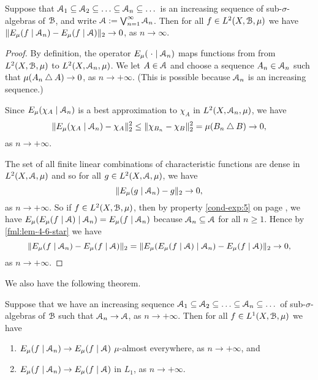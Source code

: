 \begin{lemma} \label{lem:walters-4-6}
	Suppose that $\A_1 \subset \A_2 \subset \dots \subset \A_n \subset \dots$ is an increasing sequence of sub-$\sigma$-algebras of $\mathcal{B}$, and write $\mathcal{A} := \bigvee_{n = 1}^\infty{\mathcal{A}_n}$. Then for all $f \in L^2(X, \mathcal{B}, \mu)$ we have $\|E_\mu(f \mid \mathcal{A}_n) - E_\mu(f \mid \mathcal{A})\|_2 \to 0$, as $n \to \infty$.
	\begin{proof}
		By definition, the operator $E_\mu(\mathrel{}\cdot\mathrel{} \mid \mathcal{A}_n)$ maps functions from from $L^2(X, \mathcal{B}, \mu)$ to $L^2(X, \mathcal{A}_n, \mu)$. We let $A \in \mathcal{A}$ and choose a sequence $A_n \in \mathcal{A}_n$ such that $\mu(A_n \bigtriangleup A) \to 0$, as $n \to +\infty$. (This is possible because $\mathcal{A}_n$ is an increasing sequence.)
		
		Since $E_\mu(\chi_A \mid \mathcal{A}_n)$ is a best approximation to $\chi_A$ in $L^2(X, \mathcal{A}_n, \mu)$, we have
		\[
			\|E_\mu(\chi_A \mid \mathcal{A}_n) - \chi_A\|_2^2 \leq \|\chi_{B_n} - \chi_B\|_2^2 = \mu(B_n \bigtriangleup B) \to 0,
		\]
		as $n \to +\infty$.
		
		The set of all finite linear combinations of characteristic functions are dense in $L^2(X, \mathcal{A}, \mu)$ and so for all $g \in L^2(X, \mathcal{A}, \mu)$, we have
		\begin{equation} \label{fml:lem-4-6-star}
			\|E_\mu(g \mid \mathcal{A}_n) - g\|_2 \to 0,
		\end{equation}
		as $n \to +\infty$. So if $f \in L^2(X, \mathcal{B}, \mu)$, then by property \ref{cond-exp:5} on page \pageref{cond-exp:5}, we have $E_\mu(E_\mu(f \mid \mathcal{A}) \mid \mathcal{A}_n) = E_\mu(f \mid \mathcal{A}_n)$ because $\mathcal{A}_n \subseteq \mathcal{A}$ for all $n \geq 1$. Hence by \eqref{fml:lem-4-6-star} we have
		\[
			\|E_\mu(f \mid \mathcal{A}_n) - E_\mu(f \mid \mathcal{A})\|_2 = \|E_\mu(E_\mu(f \mid \mathcal{A}) \mid \mathcal{A}_n) - E_\mu(f \mid \mathcal{A})\|_2 \to 0,
		\]
		as $n \to +\infty$.
	\end{proof}
\end{lemma}

We also have the following theorem.

\begin{theorem} \label{thm:increasing-martingale}
	Suppose that we have an increasing sequence $\A_1 \subset \A_2 \subset \dots \subset \A_n \subset \dots$ of sub-$\sigma$-algebras of $\mathcal{B}$ such that $\mathcal{A}_n \to \mathcal{A}$, as $n \to +\infty$. Then for all $f \in L^1(X, \mathcal{B}, \mu)$ we have
	\begin{enumerate}
		\item $E_\mu(f \mid \mathcal{A}_n) \to E_\mu(f \mid \mathcal{A})$ $\mu$-almost everywhere, as $n \to +\infty$, and
		\item $E_\mu(f \mid \mathcal{A}_n) \to E_\mu(f \mid \mathcal{A})$ in $L_1$, as $n \to +\infty$.
	\end{enumerate}
\end{theorem}

